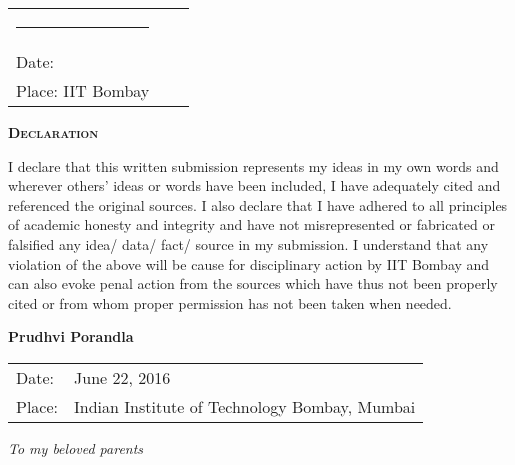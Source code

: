 \vspace{5mm}
\begin{tabular}{lll}
	\rule{40mm}{0pt}        & \rule{50mm}{0pt}       & \rule{60mm}{0pt} \\
	Date:					&                        & \\
	Place: IIT Bombay       &                        & \\
\end{tabular}
\newpage
\thispagestyle{empty}
\begin{center}
	\begin{Huge}
		\textsc{\textbf{Declaration}}
	\end{Huge}
\end{center}

\vspace{0.5in}

 I declare that this written submission represents my ideas in my own words and wherever others' ideas or words have been included, I have adequately cited and referenced the original sources. I also declare that I have adhered to all principles of academic honesty and integrity and have not misrepresented or fabricated or falsified any idea/ data/ fact/ source in my submission. I understand that any violation of the above will be cause for disciplinary action by IIT Bombay and can also evoke penal action from the sources which have thus not been properly cited or from whom proper permission has not been taken when needed.

\vspace{1.5in}
	\hfill \textbf{Prudhvi Porandla}\\
	\noindent
	\begin{tabular}{ll}
		Date: & June 22, 2016\\ \vspace{30pt}
		Place: & Indian Institute of Technology Bombay, Mumbai\\
	\end{tabular}

		\newpage
		\thispagestyle{empty}    %

		\begin{center}  \null\vfill
			\textit{\Large To my beloved parents}
			\null\vfill
		\end{center}

